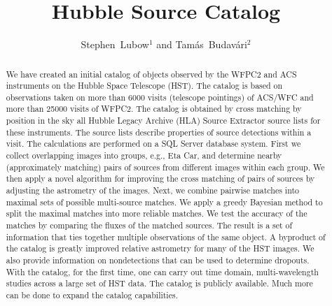
\resetcounters




\title{Hubble Source Catalog}
\author{Stephen~Lubow$^1$ and Tam\'as~Budav{\'a}ri$^2$
}


\begin{abstract}
We have created an initial catalog of objects observed by the WFPC2 and ACS instruments on the Hubble Space Telescope (HST). The catalog is based on observations taken on more than 6000 visits (telescope pointings) of ACS/WFC and more than 25000 visits of WFPC2. The catalog is obtained by cross matching by position in the sky all Hubble Legacy Archive (HLA) Source Extractor source lists for these instruments. The source lists describe properties of source detections within a visit. The calculations are performed on a SQL Server database system. First we collect overlapping images into groups, e.g., Eta Car, and determine nearby (approximately matching) pairs of sources from different images within each group. We then apply a novel algorithm for improving the cross matching of pairs of sources by adjusting the astrometry of the images. Next, we combine pairwise matches into maximal sets of possible multi-source matches. We apply a greedy Bayesian method to split the maximal matches into more reliable matches. We test the accuracy of the matches by comparing the fluxes of the matched sources. The result is a set of information that ties together multiple observations of the same object. A byproduct of the catalog is greatly improved relative astrometry for many of the HST images. We also provide information on nondetections that can be used to determine dropouts. With the catalog, for the first time, one can carry out time domain, multi-wavelength studies across a large set of HST data. The catalog is publicly available. Much more can be done to expand the catalog capabilities.

\end{abstract}

